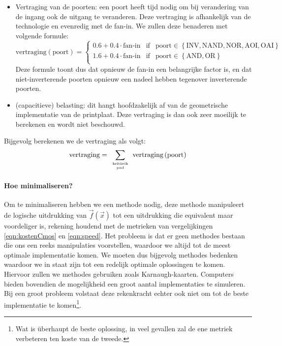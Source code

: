 \begin{itemize}
\begin{itemize}
\item Vertraging van de poorten: een poort heeft tijd nodig om bij verandering van de ingang ook de uitgang te veranderen. Deze vertraging is afhankelijk van de technologie en evenredig met de fan-in. We zullen deze benaderen met volgende formule:
\begin{equation}
\mbox{vertraging}\left(\mbox{poort}\right)=\left\{\begin{array}{lcl}
0.6+0.4\cdot\mbox{fan-in}&\mbox{if}&\mbox{poort}\in\left\{\mbox{INV},\mbox{NAND},\mbox{NOR},\mbox{AOI},\mbox{OAI}\right\}\\
1.6+0.4\cdot\mbox{fan-in}&\mbox{if}&\mbox{poort}\in\left\{\mbox{AND},\mbox{OR}\right\}\\
\end{array}\right.
\label{eqn:speedPoort}
\end{equation}
Deze formule toont dus dat opnieuw de fan-in een belangrijke factor is, en dat niet-inverterende poorten opnieuw een nadeel hebben tegenover inverterende poorten.
\item (capacitieve) belasting: dit hangt hoofdzakelijk af van de geometrische implementatie van de printplaat. Deze vertraging is dan ook zeer moeilijk te berekenen en wordt niet beschouwd.
\end{itemize}
Bijgevolg berekenen we de vertraging als volgt:
\begin{equation}
\mbox{vertraging}=\displaystyle\sum_{\tiny\begin{array}{c}\mbox{kritisch}\\\mbox{pad}\end{array}}{\mbox{vertraging}\left(\mbox{poort}\right)}
\label{eqn:speed}
\end{equation}
\end{itemize}
\paragraph{Hoe minimaliseren?}Om te minimaliseren hebben we een methode nodig, deze methode manipuleert de logische uitdrukking van $\vec{f}(\vec{x})$ tot een uitdrukking die equivalent maar voordeliger is, rekening houdend met de metrieken van vergelijkingen \ref{eqn:kostenCmos} en \ref{eqn:speed}. Het probleem is dat er geen methodes bestaan die ons een reeks manipulaties voorstellen, waardoor we altijd tot de meest optimale implementatie komen. We moeten dus bijgevolg methodes bedenken waardoor we in staat zijn tot een redelijk optimale oplossingen te komen. Hiervoor zullen we methodes gebruiken zoals Karnaugh-kaarten. Computers bieden bovendien de mogelijkheid een groot aantal implementaties te simuleren. Bij een groot probleem volstaat deze rekenkracht echter ook niet om tot de beste implementatie te komen\footnote{Wat is \"uberhaupt de beste oplossing, in veel gevallen zal de ene metriek verbeteren ten koste van de tweede.}.
